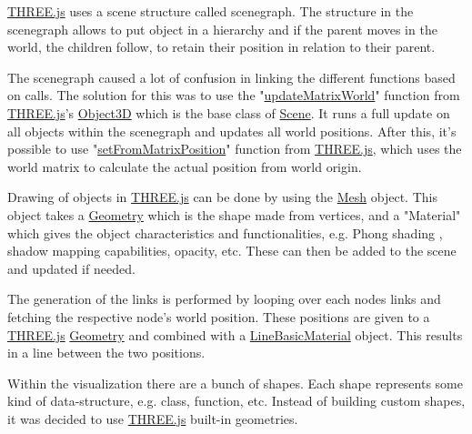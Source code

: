 



\href{https://threejs.org/}{THREE.js} uses a scene structure called \gls{scenegraph}. The structure in the \gls{scenegraph} allows to put object in a hierarchy and if the parent moves in the world, the children follow, to retain their position in relation to their parent. 

The \gls{scenegraph} caused a lot of confusion in linking the different functions based on calls. The solution for this was to use the "\href{https://threejs.org/docs/#api/en/core/Object3D.updateMatrixWorld}{updateMatrixWorld}" function from \href{https://threejs.org/}{THREE.js}'s \href{https://threejs.org/docs/#api/en/core/Object3D}{Object3D} which is the base class of \href{https://threejs.org/docs/#api/en/scenes/Scene}{Scene}. It runs a full update on all objects within the \gls{scenegraph} and updates all world positions. After this, it's possible to use "\href{https://threejs.org/docs/#api/en/math/Vector3.setFromMatrixPosition}{setFromMatrixPosition}" function from \href{https://threejs.org/}{THREE.js}, which uses the world matrix to calculate the actual position from world origin. 

Drawing of objects in \href{https://threejs.org/}{THREE.js} can be done by using the \href{https://threejs.org/docs/#api/en/objects/Mesh}{Mesh} object. This object takes a \href{https://threejs.org/docs/#api/en/core/Geometry}{Geometry} which is the shape made from vertices, and a "Material" which gives the object characteristics and functionalities, e.g. Phong shading \cite{acm:phongShading1986book}, shadow mapping \cite{acm:perspectiveShadowMap2002book} capabilities, opacity, etc. These can then be added to the scene and updated if needed. 

The generation of the links is performed by looping over each nodes links and fetching the respective node's world position. These positions are given to a \href{https://threejs.org/}{THREE.js} \href{https://threejs.org/docs/#api/en/core/Geometry}{Geometry} and combined with a \href{https://threejs.org/docs/#api/en/materials/LineBasicMaterial}{LineBasicMaterial} object. This results in a line between the two positions. %

Within the visualization there are a bunch of shapes. Each shape represents some kind of data-structure, e.g. class, function, etc. Instead of building custom shapes, it was decided to use \href{https://threejs.org/}{THREE.js} built-in geometries. 

